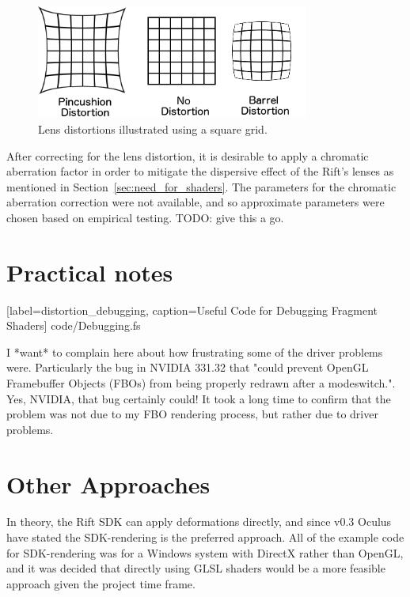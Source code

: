 \documentclass[MSc,paper=a4,pagesize=auto]{icldt}
\begin{document}
\begin{figure}[htbp!]
    \centering
    \includegraphics[width=0.8\textwidth]{resources/distortions}
    \caption{Lens distortions illustrated using a square grid.}
    \label{fig:distortions}
\end{figure}

After correcting for the lens distortion, it is desirable to apply a chromatic aberration factor in order to mitigate the dispersive effect of the Rift's lenses as mentioned in Section~\ref{sec:need_for_shaders}. The parameters for the chromatic aberration correction were not available, and so approximate parameters were chosen based on empirical testing. TODO: give this a go. 

\section{Practical notes}


  [label=distortion_debugging, caption=Useful Code for Debugging Fragment Shaders]
  {code/Debugging.fs}
  
I *want* to complain here about how frustrating some of the driver problems were. Particularly the bug in NVIDIA 331.32 that "could prevent OpenGL Framebuffer Objects (FBOs) from being properly redrawn after a modeswitch.". Yes, NVIDIA, that bug certainly could! It took a long time to confirm that the problem was not due to my FBO rendering process, but rather due to driver problems.


\section{Other Approaches}
In theory, the Rift SDK can apply deformations directly, and since v0.3 Oculus have stated the SDK-rendering is the preferred approach. All of the example code for SDK-rendering was for a Windows system with DirectX rather than OpenGL, and it was decided that directly using GLSL shaders would be a more feasible approach given the project time frame. 
\end{document}
